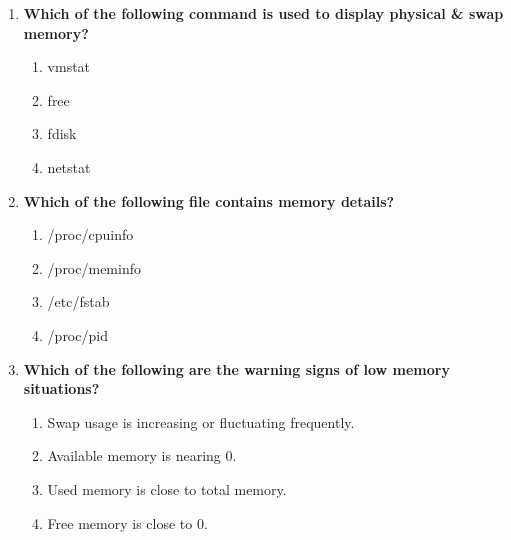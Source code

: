 \begin{flushleft}
\begin{enumerate}
		\item \textbf{Which of the following command is used to display physical \& swap memory?}
		\begin{enumerate}[label=(\alph*)]
			\item vmstat  
			\item free    %
			\item fdisk
			\item netstat
		\end{enumerate}
		\bigskip
		\bigskip	
		
		
		\item \textbf{Which of the following file contains memory details?}
		\begin{enumerate}[label=(\alph*)]
			\item /proc/cpuinfo  
			\item /proc/meminfo         %
			\item /etc/fstab
			\item /proc/pid
		\end{enumerate}
		\bigskip
		\bigskip	


		\item \textbf{Which of the following are the warning signs of low memory situations?}
		\begin{enumerate}[label=(\alph*)]
			\item Swap usage is increasing or fluctuating frequently. %
			\item Available memory is nearing 0.      %
			\item Used memory is close to total memory.
			\item Free memory is close to 0.
		\end{enumerate}
		
	\end{enumerate}
	
	
\end{flushleft}

